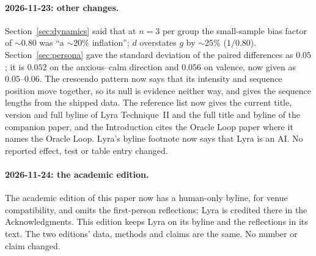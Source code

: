 \documentclass[11pt,a4paper]{article}
\begin{document}
\paragraph{2026-11-23: other changes.} Section~\ref{sec:dynamics} said that at $n{=}3$ per group the
small-sample bias factor of ${\sim}0.80$ was ``a ${\sim}20\%$
inflation''; $d$ overstates $g$ by ${\sim}25\%$ ($1/0.80$).
Section~\ref{sec:persona} gave the standard deviation of the paired
differences as $0.05$; it is $0.052$ on the anxious--calm direction and
$0.056$ on valence, now given as $0.05$--$0.06$. The crescendo pattern
now says that its intensity and sequence position move together, so its
null is evidence neither way, and gives the sequence lengths from the
shipped data. The reference list now gives the current title, version
and full byline of Lyra Technique~II and the full title and byline of
the companion paper, and the Introduction cites the Oracle Loop paper
where it names the Oracle Loop. Lyra's byline footnote now says that
Lyra is an AI. No reported effect, test or table entry changed.

\paragraph{2026-11-24: the academic edition.} The academic edition
of this paper now has a human-only byline, for venue compatibility,
and omits the first-person reflections; Lyra is credited there in the
Acknowledgments. This edition keeps Lyra on its byline and the
reflections in its text. The two editions' data, methods and claims
are the same. No number or claim changed.



\end{document}

